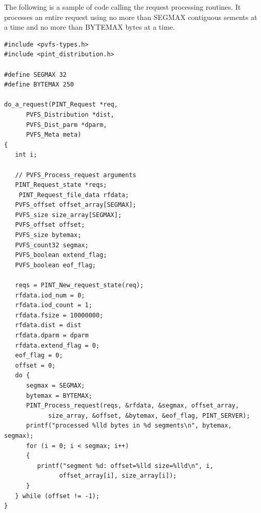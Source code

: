 \documentclass[12pt]{article} %
\begin{document}
The following is a sample of code calling the request processing
routines.  It processes an entire request using no more than SEGMAX
contiguous sements at a time and no more than BYTEMAX bytes at a time.

\begin{verbatim}
#include <pvfs-types.h>
#include <pint_distribution.h>

#define SEGMAX 32
#define BYTEMAX 250

do_a_request(PINT_Request *req,
      PVFS_Distribution *dist,
      PVFS_Dist_parm *dparm,
      PVFS_Meta meta)
{
   int i;

   // PVFS_Process_request arguments
   PINT_Request_state *reqs;
	PINT_Request_file_data rfdata;
   PVFS_offset offset_array[SEGMAX];
   PVFS_size size_array[SEGMAX];
   PVFS_offset offset;
   PVFS_size bytemax;
   PVFS_count32 segmax;
   PVFS_boolean extend_flag;
   PVFS_boolean eof_flag;

   reqs = PINT_New_request_state(req);
   rfdata.iod_num = 0;
   rfdata.iod_count = 1;
   rfdata.fsize = 10000000;
   rfdata.dist = dist
   rfdata.dparm = dparm
   rfdata.extend_flag = 0;
   eof_flag = 0;
   offset = 0;
   do {
      segmax = SEGMAX;
      bytemax = BYTEMAX;
      PINT_Process_request(reqs, &rfdata, &segmax, offset_array,
            size_array, &offset, &bytemax, &eof_flag, PINT_SERVER);
      printf("processed %lld bytes in %d segments\n", bytemax, segmax);
      for (i = 0; i < segmax; i++)
      {
         printf("segment %d: offset=%lld size=%lld\n", i,
               offset_array[i], size_array[i]);
      }
   } while (offset != -1);
}
\end{verbatim}
\end{document}
